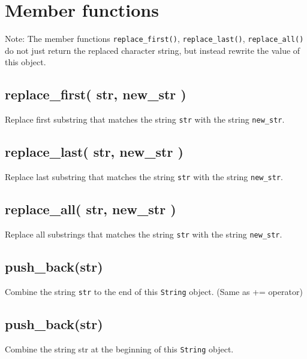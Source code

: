 \documentclass[]{book}
\begin{document}
\hypertarget{member-functions-4}{%
\section{Member functions}\label{member-functions-4}}

Note: The member functions \texttt{replace\_first()}, \texttt{replace\_last()}, \texttt{replace\_all()} do not just return the replaced character string, but instead rewrite the value of this object.

\hypertarget{replace_first-str-new_str}{%
\subsection{replace\_first( str, new\_str )}\label{replace_first-str-new_str}}

Replace first substring that matches the string \texttt{str} with the string \texttt{new\_str}.

\hypertarget{replace_last-str-new_str}{%
\subsection{replace\_last( str, new\_str )}\label{replace_last-str-new_str}}

Replace last substring that matches the string \texttt{str} with the string \texttt{new\_str}.

\hypertarget{replace_all-str-new_str}{%
\subsection{replace\_all( str, new\_str )}\label{replace_all-str-new_str}}

Replace all substrings that matches the string \texttt{str} with the string \texttt{new\_str}.

\hypertarget{push_backstr}{%
\subsection{push\_back(str)}\label{push_backstr}}

Combine the string \texttt{str} to the end of this \texttt{String} object. (Same as += operator)

\hypertarget{push_backstr-1}{%
\subsection{push\_back(str)}\label{push_backstr-1}}

Combine the string str at the beginning of this \texttt{String} object.
\end{document}

